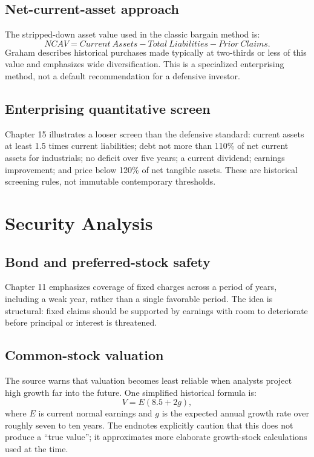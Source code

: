 \documentclass[11pt]{article}
\begin{document}
\subsection{Net-current-asset approach}
The stripped-down asset value used in the classic bargain method is:
\begin{equation}
NCAV = Current\ Assets - Total\ Liabilities - Prior\ Claims.
\end{equation}
Graham describes historical purchases made typically at two-thirds or less of this value and emphasizes wide diversification. This is a specialized enterprising method, not a default recommendation for a defensive investor.

\subsection{Enterprising quantitative screen}
Chapter 15 illustrates a looser screen than the defensive standard: current assets at least 1.5 times current liabilities; debt not more than 110\% of net current assets for industrials; no deficit over five years; a current dividend; earnings improvement; and price below 120\% of net tangible assets. These are historical screening rules, not immutable contemporary thresholds.

\section{Security Analysis}
\subsection{Bond and preferred-stock safety}
Chapter 11 emphasizes coverage of fixed charges across a period of years, including a weak year, rather than a single favorable period. The idea is structural: fixed claims should be supported by earnings with room to deteriorate before principal or interest is threatened.

\subsection{Common-stock valuation}
The source warns that valuation becomes least reliable when analysts project high growth far into the future. One simplified historical formula is:
\begin{equation}
V = E(8.5 + 2g),
\end{equation}
where $E$ is current normal earnings and $g$ is the expected annual growth rate over roughly seven to ten years. The endnotes explicitly caution that this does not produce a ``true value''; it approximates more elaborate growth-stock calculations used at the time.
\end{document}
